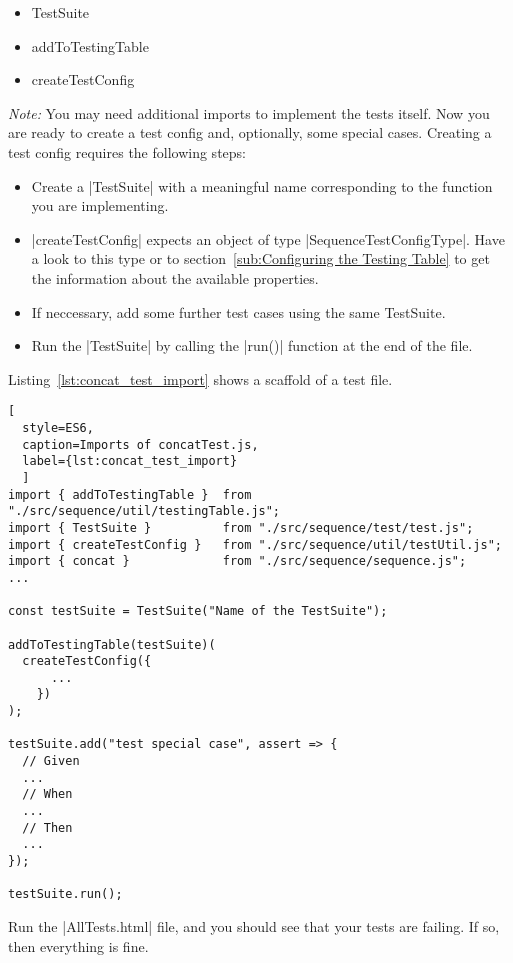 \begin{itemize}
  \item{TestSuite}
  \item{addToTestingTable}
  \item{createTestConfig}
\end{itemize}

\textit{Note:} You may need additional imports to implement the tests itself.
\newline
Now you are ready to create a test config and, optionally, some special cases.
Creating a test config requires the following steps:

\begin{itemize}
  \item{Create a |TestSuite| with a meaningful name corresponding to the function you are implementing.}
  \item{|createTestConfig| expects an object of type |SequenceTestConfigType|. Have a look
    to this type or to section~\ref{sub:Configuring the Testing Table} to get the information about the available properties. }
      \item{If neccessary, add some further test cases using the same TestSuite.}
  \item{Run the |TestSuite| by calling the |run()| function at the end of the file. }
\end{itemize}

Listing~\ref{lst:concat_test_import} shows a scaffold of a test file. 

\begin{lstlisting}[
  style=ES6, 
  caption=Imports of concatTest.js,
  label={lst:concat_test_import}
  ]
import { addToTestingTable }  from "./src/sequence/util/testingTable.js";
import { TestSuite }          from "./src/sequence/test/test.js";
import { createTestConfig }   from "./src/sequence/util/testUtil.js";
import { concat }             from "./src/sequence/sequence.js";
...

const testSuite = TestSuite("Name of the TestSuite");

addToTestingTable(testSuite)(
  createTestConfig({
      ...
    })
);

testSuite.add("test special case", assert => {
  // Given
  ...
  // When
  ...
  // Then
  ...
});

testSuite.run();
\end{lstlisting}

Run the |AllTests.html| file, and you should see that your tests are failing.
If so, then everything is fine.

